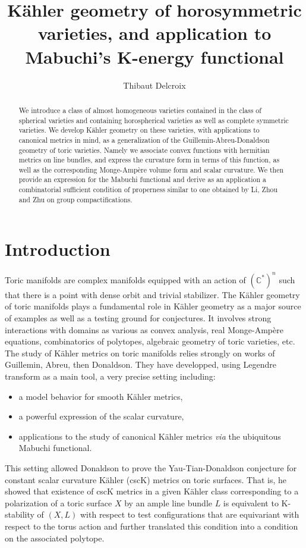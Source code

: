 \documentclass{amsart}
\theoremstyle{definition}
\begin{document}
\title[Horosymmetric varieties]{Kähler geometry of horosymmetric varieties, 
and application to Mabuchi's K-energy functional}

\author{Thibaut Delcroix}

\date{}

\begin{abstract}
We introduce a class of almost homogeneous varieties contained in the class of spherical 
varieties and containing horospherical varieties as well as complete symmetric 
varieties. We develop Kähler geometry on these varieties, with applications to 
canonical metrics in mind, as a generalization of the Guillemin-Abreu-Donaldson 
geometry of toric varieties. Namely we associate convex functions with hermitian 
metrics on line bundles, and express the curvature form in terms of this function,
as well as the corresponding Monge-Ampère volume form and scalar curvature.  
We then provide an expression for the Mabuchi functional and derive as an 
application a combinatorial sufficient condition of properness similar to 
one obtained by Li, Zhou and Zhu on 
group compactifications.
\end{abstract}

\maketitle


\section*{Introduction}

Toric manifolds are complex manifolds equipped with an action of $(\mathbb{C}^*)^n$ 
such that there is a point with dense orbit and trivial stabilizer. 
The Kähler geometry of toric manifolds plays a fundamental role in Kähler geometry 
as a major source of examples as well as a testing ground for conjectures. It 
involves strong interactions with domains as various as convex analysis, 
real Monge-Ampère equations, combinatorics of polytopes, 
algebraic geometry of toric varieties, etc.
The study of Kähler metrics on toric manifolds relies strongly on works of 
Guillemin, Abreu, then Donaldson. They have developped, using Legendre transform 
as a main tool, a very precise setting including: 
\begin{itemize}
\item a model behavior for smooth Kähler metrics,
\item a powerful expression of the scalar curvature, 
\item applications to the study of canonical Kähler metrics \emph{via} the 
ubiquitous Mabuchi functional.
\end{itemize}
This setting allowed Donaldson to prove the Yau-Tian-Donaldson conjecture for 
constant scalar curvature Kähler (cscK) metrics on toric surfaces. That is, he showed that 
existence of cscK metrics in a given Kähler class corresponding to a polarization 
of a toric surface $X$ by an ample line bundle $L$ is equivalent to K-stability 
of $(X,L)$ with respect to test configurations that are equivariant with respect 
to the torus action and further translated this condition into a condition on the 
associated polytope.
\end{document}
